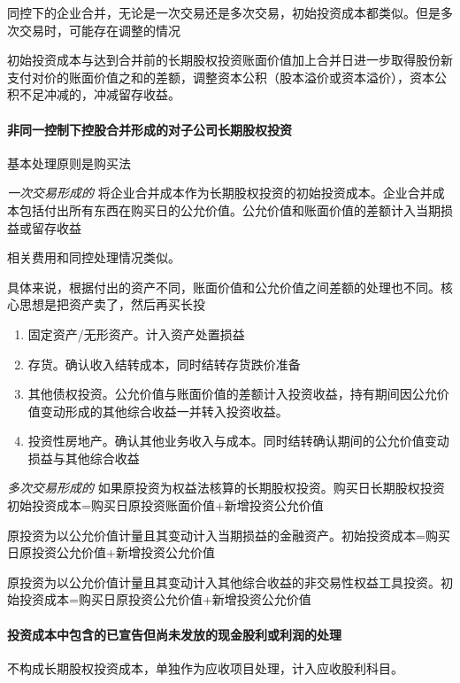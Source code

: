 \documentclass[UTF8,12pt]{ctexart}
\numberwithin{equation}{section} %
\numberwithin{figure}{section}
\numberwithin{table}{section}
\begin{document}
	同控下的企业合并，无论是一次交易还是多次交易，初始投资成本都类似。但是多次交易时，可能存在调整的情况
	
	初始投资成本与达到合并前的长期股权投资账面价值加上合并日进一步取得股份新支付对价的账面价值之和的差额，调整资本公积（股本溢价或资本溢价），资本公积不足冲减的，冲减留存收益。
	
	
	
	\paragraph{非同一控制下控股合并形成的对子公司长期股权投资}
	
	基本处理原则是购买法
	
	\textit{一次交易形成的}
	将企业合并成本作为长期股权投资的初始投资成本。企业合并成本包括付出所有东西在购买日的公允价值。公允价值和账面价值的差额计入当期损益或留存收益
	
	相关费用和同控处理情况类似。
	
	具体来说，根据付出的资产不同，账面价值和公允价值之间差额的处理也不同。核心思想是把资产卖了，然后再买长投
	\begin{enumerate}
		\item 固定资产/无形资产。计入资产处置损益
		
		\item 存货。确认收入结转成本，同时结转存货跌价准备
		
		\item 其他债权投资。公允价值与账面价值的差额计入投资收益，持有期间因公允价值变动形成的其他综合收益一并转入投资收益。
		
		\item 投资性房地产。确认其他业务收入与成本。同时结转确认期间的公允价值变动损益与其他综合收益
	\end{enumerate}
	
	\textit{多次交易形成的}
	如果原投资为权益法核算的长期股权投资。购买日长期股权投资初始投资成本=购买日原投资账面价值+新增投资公允价值
	
	原投资为以公允价值计量且其变动计入当期损益的金融资产。初始投资成本=购买日原投资公允价值+新增投资公允价值
	
	原投资为以公允价值计量且其变动计入其他综合收益的非交易性权益工具投资。初始投资成本=购买日原投资公允价值+新增投资公允价值
	
	
	\paragraph{投资成本中包含的已宣告但尚未发放的现金股利或利润的处理}
	不构成长期股权投资成本，单独作为应收项目处理，计入应收股利科目。
	
\end{document}
